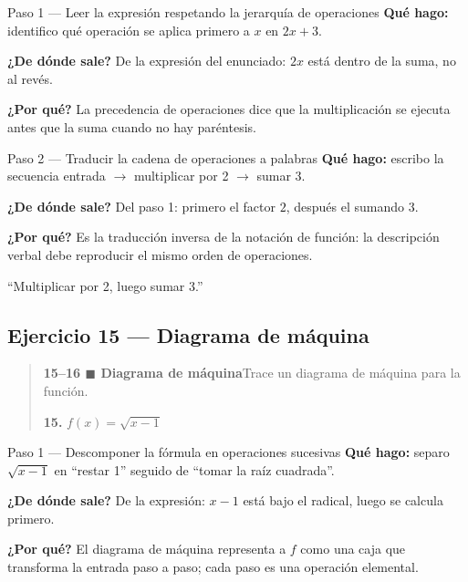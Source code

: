\documentclass[11pt]{article}
\begin{document}
\begin{paso}{Paso 1 --- Leer la expresión respetando la jerarquía de operaciones}
\textbf{Qué hago:} identifico qué operación se aplica primero a $x$ en $2x+3$.

\textbf{¿De dónde sale?} De la expresión del enunciado: $2x$ está dentro de la suma, no al revés.

\textbf{¿Por qué?} La precedencia de operaciones dice que la multiplicación se ejecuta antes que la suma cuando no hay paréntesis.
\end{paso}

\begin{paso}{Paso 2 --- Traducir la cadena de operaciones a palabras}
\textbf{Qué hago:} escribo la secuencia entrada $\to$ multiplicar por 2 $\to$ sumar 3.

\textbf{¿De dónde sale?} Del paso 1: primero el factor $2$, después el sumando $3$.

\textbf{¿Por qué?} Es la traducción inversa de la notación de función: la descripción verbal debe reproducir el mismo orden de operaciones.
\end{paso}

\begin{resp}
``Multiplicar por 2, luego sumar 3.''
\end{resp}

\subsection*{Ejercicio 15 — Diagrama de máquina}

\begin{quote}
\textbf{15--16 $\blacksquare$ Diagrama de máquina}\quad Trace un diagrama de máquina para la función.

\textbf{15.} $f(x)=\sqrt{x-1}$
\end{quote}

\begin{paso}{Paso 1 --- Descomponer la fórmula en operaciones sucesivas}
\textbf{Qué hago:} separo $\sqrt{x-1}$ en ``restar 1'' seguido de ``tomar la raíz cuadrada''.

\textbf{¿De dónde sale?} De la expresión: $x-1$ está bajo el radical, luego se calcula primero.

\textbf{¿Por qué?} El diagrama de máquina representa a $f$ como una caja que transforma la entrada paso a paso; cada paso es una operación elemental.
\end{paso}
\end{document}
